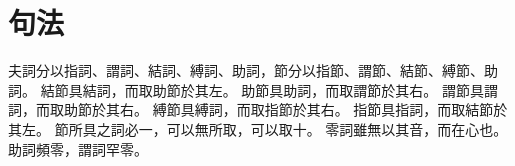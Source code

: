 \chapter*{句法}
夫詞分以指詞、謂詞、結詞、縛詞、助詞，節分以指節、謂節、結節、縛節、助詞。
結節具結詞，而取助節於其左。
助節具助詞，而取謂節於其右。
謂節具謂詞，而取助節於其右。
縛節具縛詞，而取指節於其右。
指節具指詞，而取結節於其左。
節所具之詞必一，可以無所取，可以取十。
零詞雖無以其音，而在心也。
助詞頻零，謂詞罕零。
